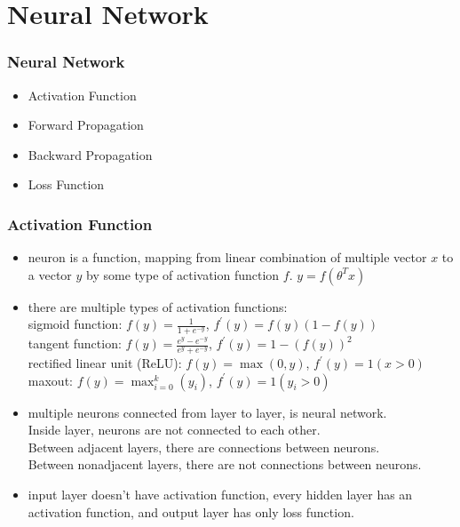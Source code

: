 
\ifx\allfiles\undefined

\fi
\section{Neural Network}
\begin{frame}
\frametitle{Neural Network}
	\small
	\begin{itemize}
		\item Activation Function 
		\item Forward Propagation
		\item Backward Propagation
		\item Loss Function
	\end{itemize}
\end{frame}
\begin{frame}
\frametitle{Activation Function}
	\small
	\begin{itemize}
		\item neuron is a function, mapping from linear combination of multiple vector $x$ to a vector $y$ by some type of activation function $f$. 
			$y=f(\theta^Tx)$ 
		\item there are multiple types of activation functions:
			\\sigmoid function: $f(y)=\frac{1}{1+e^{-y}}$, $f^\prime(y)=f(y)(1-f(y))$
			\\tangent function: $f(y)=\frac{e^{y}-e^{-y}}{e^{y}+e^{-y}}$, $f^\prime(y)=1-(f(y))^2$
			\\rectified linear unit (ReLU): $f(y)=\max(0,y)$, $f^\prime(y)=1(x>0)$
			\\maxout: $f(y)=\max_{i=0}^{k}(y_i)$, $f^\prime(y)=1(y_i>0)$
		\item multiple neurons connected from layer to layer, is neural network. 
			\footnotesize
			\\\hspace{1cm}Inside layer, neurons are not connected to each other. 
			\\\hspace{1cm}Between adjacent layers, there are connections between neurons. 
			\\\hspace{1cm}Between nonadjacent layers, there are not connections between neurons.
		\item input layer doesn't have activation function, every hidden layer has an activation function, and output layer has only loss function.
	\end{itemize}
\end{frame}
